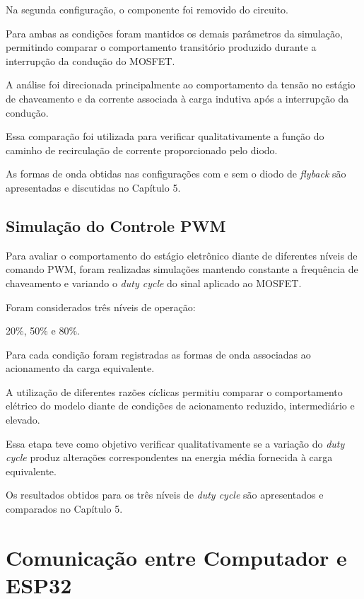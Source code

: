 Na segunda configuração, o componente foi removido do circuito.

Para ambas as condições foram mantidos os demais parâmetros da simulação, permitindo comparar o comportamento transitório produzido durante a interrupção da condução do MOSFET.

A análise foi direcionada principalmente ao comportamento da tensão no estágio de chaveamento e da corrente associada à carga indutiva após a interrupção da condução.

Essa comparação foi utilizada para verificar qualitativamente a função do caminho de recirculação de corrente proporcionado pelo diodo.

As formas de onda obtidas nas configurações com e sem o diodo de \textit{flyback} são apresentadas e discutidas no Capítulo 5.

\subsection{Simulação do Controle PWM}
\label{sec:simulacao_pwm}

Para avaliar o comportamento do estágio eletrônico diante de diferentes níveis de comando PWM, foram realizadas simulações mantendo constante a frequência de chaveamento e variando o \textit{duty cycle} do sinal aplicado ao MOSFET.

Foram considerados três níveis de operação:

20\%, 50\% e 80\%.

Para cada condição foram registradas as formas de onda associadas ao acionamento da carga equivalente.

A utilização de diferentes razões cíclicas permitiu comparar o comportamento elétrico do modelo diante de condições de acionamento reduzido, intermediário e elevado.

Essa etapa teve como objetivo verificar qualitativamente se a variação do \textit{duty cycle} produz alterações correspondentes na energia média fornecida à carga equivalente.

Os resultados obtidos para os três níveis de \textit{duty cycle} são apresentados e comparados no Capítulo 5.

\section{Comunicação entre Computador e ESP32}
\label{sec:comunicacao_udp}

